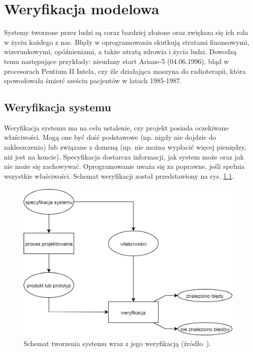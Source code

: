 \chapter{Weryfikacja modelowa}

Systemy tworzone przez ludzi są coraz bardziej złożone oraz zwiększa się ich rola w życiu każdego z nas.
Błędy w oprogramowaniu skutkują stratami finansowymi, wizerunkowymi, opóźnieniami, a także utratą zdrowia i życia ludzi. Dowodzą temu następujące przykłady: nieudany start Ariane-5 (04.06.1996), błąd w procesorach Pentium II Intela, czy źle działająca maszyna do radioterapii, która spowodowała śmierć sześciu pacjentów w latach 1985-1987.


\section{Weryfikacja systemu}

Weryfikacja systemu ma na celu ustalenie, czy projekt posiada oczekiwane właściwości. Mogą one być dość podstawowe (np. nigdy nie dojdzie do zakleszczenia) lub związane z domeną (np. nie można wypłacić więcej pieniędzy, niż jest na koncie). Specyfikacja dostarcza informacji, jak system może oraz jak nie może się zachowywać. Oprogramowanie uważa się za poprawne, jeśli spełnia wszystkie właściwości. Schemat weryfikacji został przedstawiony na rys. \ref{fig:system_verification_scheme}.

\begin{figure}[h]
    \centering
    \includegraphics[height=8cm,keepaspectratio]{img/system_verification_schematic_view.png}
    \caption{Schemat tworzenia systemu wraz z jego weryfikacją (źródło~\cite{Bai08}).}
    \label{fig:system_verification_scheme}
\end{figure}

